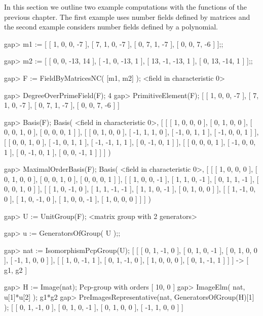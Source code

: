 

In this section we outline two example computations with the functions
of the previous chapter. The first example uses number fields defined 
by matrices and the second example considers number fields defined by
a polynomial.


\beginexample
gap> m1 := [ [ 1, 0, 0, -7 ], 
             [ 7, 1, 0, -7 ], 
             [ 0, 7, 1, -7 ],
             [ 0, 0, 7, -6 ] ];;

gap> m2 := [ [ 0, 0, -13, 14 ], 
             [ -1, 0, -13, 1 ], 
             [ 13, -1, -13, 1 ], 
             [ 0, 13, -14, 1 ] ];;

gap> F := FieldByMatricesNC( [m1, m2] );
<field in characteristic 0>

gap> DegreeOverPrimeField(F);
4
gap> PrimitiveElement(F);
[ [ 1, 0, 0, -7 ], [ 7, 1, 0, -7 ], [ 0, 7, 1, -7 ], [ 0, 0, 7, -6 ] ]

gap> Basis(F);
Basis( <field in characteristic 0>, 
[ [ [ 1, 0, 0, 0 ], [ 0, 1, 0, 0 ], [ 0, 0, 1, 0 ], [ 0, 0, 0, 1 ] ], 
  [ [ 0, 1, 0, 0 ], [ -1, 1, 1, 0 ], [ -1, 0, 1, 1 ], [ -1, 0, 0, 1 ] ], 
  [ [ 0, 0, 1, 0 ], [ -1, 0, 1, 1 ], [ -1, -1, 1, 1 ], [ 0, -1, 0, 1 ] ], 
  [ [ 0, 0, 0, 1 ], [ -1, 0, 0, 1 ], [ 0, -1, 0, 1 ], [ 0, 0, -1, 1 ] ] ] )

gap> MaximalOrderBasis(F);
Basis( <field in characteristic 0>, 
[ [ [ 1, 0, 0, 0 ], [ 0, 1, 0, 0 ], [ 0, 0, 1, 0 ], [ 0, 0, 0, 1 ] ], 
  [ [ 1, 0, 0, -1 ], [ 1, 1, 0, -1 ], [ 0, 1, 1, -1 ], [ 0, 0, 1, 0 ] ], 
  [ [ 1, 0, -1, 0 ], [ 1, 1, -1, -1 ], [ 1, 1, 0, -1 ], [ 0, 1, 0, 0 ] ], 
  [ [ 1, -1, 0, 0 ], [ 1, 0, -1, 0 ], [ 1, 0, 0, -1 ], [ 1, 0, 0, 0 ] ] ] )

gap> U := UnitGroup(F);
<matrix group with 2 generators>

gap> u := GeneratorsOfGroup( U );;

gap> nat := IsomorphismPcpGroup(U);
[ [ [ 0, 1, -1, 0 ], [ 0, 1, 0, -1 ], [ 0, 1, 0, 0 ], [ -1, 1, 0, 0 ] ], 
  [ [ 1, 0, -1, 1 ], [ 0, 1, -1, 0 ], [ 1, 0, 0, 0 ], [ 0, 1, -1, 1 ] ] ] -> 
[ g1, g2 ]

gap> H := Image(nat);
Pcp-group with orders [ 10, 0 ]
gap> ImageElm( nat, u[1]*u[2] );
g1*g2
gap> PreImagesRepresentative(nat, GeneratorsOfGroup(H)[1] );
[ [ 0, 1, -1, 0 ], [ 0, 1, 0, -1 ], [ 0, 1, 0, 0 ], [ -1, 1, 0, 0 ] ]
\endexample

